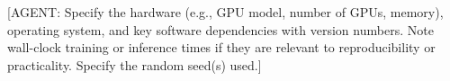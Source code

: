\documentclass[9pt,a4paper,twocolumn,twoside]{rho-class/rho}
\begin{document}
        [AGENT: Specify the hardware (e.g., GPU model,
        number of GPUs, memory), operating system, and
        key software dependencies with version numbers.
        Note wall-clock training or inference times if
        they are relevant to reproducibility or practicality.
        Specify the random seed(s) used.]

%
%
%
%
%
%
%
\end{document}
